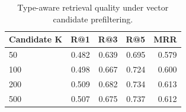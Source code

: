 \begin{table}[t]
\centering
\caption{Type-aware retrieval quality under vector candidate prefiltering.}
\label{tab:prefilter}
\begin{tabular}{lrrrr}
\toprule
Candidate K & R@1 & R@3 & R@5 & MRR \\
\midrule
50 & 0.482 & 0.639 & 0.695 & 0.579 \\
100 & 0.498 & 0.667 & 0.724 & 0.600 \\
200 & 0.509 & 0.682 & 0.734 & 0.613 \\
500 & 0.507 & 0.675 & 0.737 & 0.612 \\
\bottomrule
\end{tabular}
\end{table}
